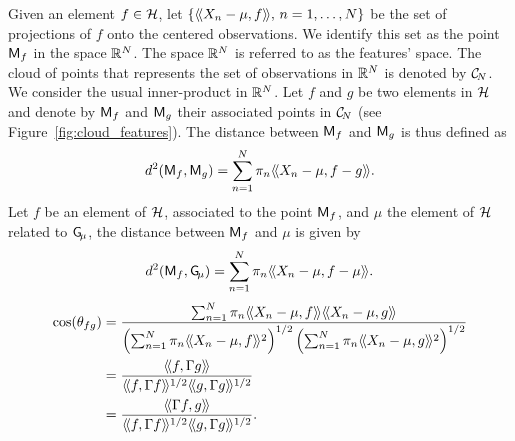 Given an element $f \in \mathcal{H}$, let $\{\langle\!\langle X_n - \mu, f\rangle\!\rangle,\,n = 1, \dots, N\}$ be the set of projections of $f$ onto the centered observations. We identify this set as the point $\mathsf{M}_f$ in the space $\mathbb{R}^N$. The space $\mathbb{R}^N$ is referred to as the features' space. The cloud of points that represents the set of observations in $\mathbb{R}^N$ is denoted by $\mathcal{C}_{\!N}$.  We consider the usual inner-product in $\mathbb{R}^N$. Let $f$ and $g$ be two elements in $\mathcal{H}$ and denote by $\mathsf{M}_f$ and $\mathsf{M}_g$ their associated points in $\mathcal{C}_{\!N}$ (see Figure~\ref{fig:cloud_features}). The distance between $\mathsf{M}_f$ and $\mathsf{M}_g$ is thus defined as
\begin{equation*}
d^2(\mathsf{M}_f, \mathsf{M}_g) = \sum_{n = 1}^N \pi_n \langle\!\langle X_n - \mu, f - g\rangle\!\rangle.
\end{equation*}
Let $f$ be an element of $\mathcal{H}$, associated to the point $\mathsf{M}_f$, and $\mu$ the element of $\mathcal{H}$ related to $\mathsf{G}_{\!\mu}$, the distance between $\mathsf{M}_f$ and $\mu$ is given by
\begin{equation*}
d^2(\mathsf{M}_f, \mathsf{G}_{\!\mu}) = \sum_{n = 1}^N \pi_n \langle\!\langle X_n - \mu, f - \mu\rangle\!\rangle.
\end{equation*}
\begin{align}
    \cos(\theta_{fg}) &= \frac{\sum_{n = 1}^N \pi_n \inH{X_n - \mu}{f}\inH{X_n - \mu}{g}}{\left(\sum_{n = 1}^N \pi_n \inH{X_n - \mu}{f}^2\right)^{1/2}\left(\sum_{n = 1}^N \pi_n \inH{X_n - \mu}{g}^2\right)^{1/2}} \\
    &= \frac{\inH{f}{\Gamma g}}{\inH{f}{\Gamma f}^{1/2}\inH{g}{\Gamma g}^{1/2}} \\
    &= \frac{\inH{\Gamma f}{g}}{\inH{f}{\Gamma f}^{1/2}\inH{g}{\Gamma g}^{1/2}}.
\end{align}

